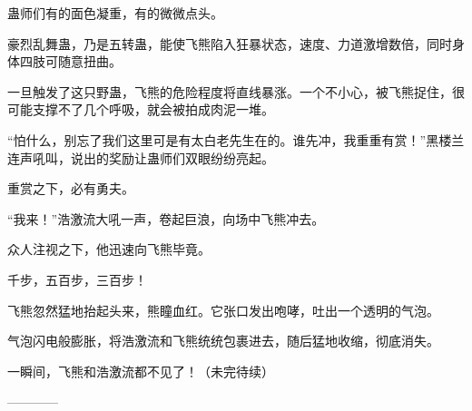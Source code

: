 \begin{this_body}
蛊师们有的面色凝重，有的微微点头。

豪烈乱舞蛊，乃是五转蛊，能使飞熊陷入狂暴状态，速度、力道激增数倍，同时身体四肢可随意扭曲。

一旦触发了这只野蛊，飞熊的危险程度将直线暴涨。一个不小心，被飞熊捉住，很可能支撑不了几个呼吸，就会被拍成肉泥一堆。

“怕什么，别忘了我们这里可是有太白老先生在的。谁先冲，我重重有赏！”黑楼兰连声吼叫，说出的奖励让蛊师们双眼纷纷亮起。

重赏之下，必有勇夫。

“我来！”浩激流大吼一声，卷起巨浪，向场中飞熊冲去。

众人注视之下，他迅速向飞熊毕竟。

千步，五百步，三百步！

飞熊忽然猛地抬起头来，熊瞳血红。它张口发出咆哮，吐出一个透明的气泡。

气泡闪电般膨胀，将浩激流和飞熊统统包裹进去，随后猛地收缩，彻底消失。

一瞬间，飞熊和浩激流都不见了！（未完待续）

------------

\end{this_body}

